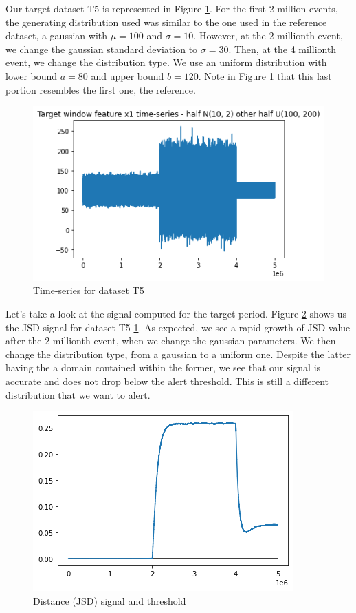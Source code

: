 Our target dataset T5 is represented in Figure \ref{fig:timeseries-t5}. For the first 2 million events, the generating distribution used was similar to the one used in the reference dataset, a gaussian with $\mu=100$ and $\sigma=10$. However, at the 2 millionth event, we change the gaussian standard deviation to $\sigma=30$. Then, at the 4 millionth event, we change the distribution type. We use an uniform distribution with lower bound $a=80$ and upper bound $b=120$. Note in Figure \ref{fig:timeseries-t5} that this last portion resembles the first one, the reference.
\begin{figure}[!htb]
    \begin{center}
      \includegraphics[scale=0.6]{figures/timeseries-t5.png}
      \caption[]{Time-series for dataset T5}
      \label{fig:timeseries-t5}
    \end{center}
\end{figure}


Let's take a look at the signal computed for the target period. Figure \ref{fig:JSD-signal-test05} shows us the JSD signal for dataset T5 \ref{fig:timeseries-t5}. As expected, we see a rapid growth of JSD value after the 2 millionth event, when we change the gaussian parameters. We then change the distribution type, from a gaussian to a uniform one. Despite the latter having the a domain contained within the former, we see that our signal is accurate and does not drop below the alert threshold. This is still a different distribution that we want to alert. 
\begin{figure}[!htb]
    \begin{center}
      \includegraphics[scale=0.6]{figures/stream-analysis-viz-test05.png}
      \caption[]{Distance (JSD) signal and threshold}
      \label{fig:JSD-signal-test05}
    \end{center}
\end{figure}

